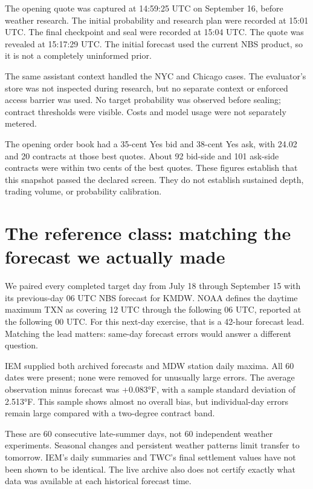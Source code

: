 \documentclass[11pt]{article}
\begin{document}
The opening quote was captured at 14:59:25 UTC on September 16, before weather research. The initial probability and research plan were recorded at 15:01 UTC. The final checkpoint and seal were recorded at 15:04 UTC. The quote was revealed at 15:17:29 UTC. The initial forecast used the current NBS product, so it is not a completely uninformed prior.


The same assistant context handled the NYC and Chicago cases. The evaluator’s store was not inspected during research, but no separate context or enforced access barrier was used. No target probability was observed before sealing; contract thresholds were visible. Costs and model usage were not separately metered.


The opening order book had a 35-cent Yes bid and 38-cent Yes ask, with 24.02 and 20 contracts at those best quotes. About 92 bid-side and 101 ask-side contracts were within two cents of the best quotes. These figures establish that this snapshot passed the declared screen. They do not establish sustained depth, trading volume, or probability calibration.


\section*{\textcolor{epdarkgreen}{The reference class: matching the forecast we actually made}}
We paired every completed target day from July 18 through September 15 with its previous-day 06 UTC NBS forecast for KMDW. NOAA defines the daytime maximum TXN as covering 12 UTC through the following 06 UTC, reported at the following 00 UTC. For this next-day exercise, that is a 42-hour forecast lead. Matching the lead matters: same-day forecast errors would answer a different question.


IEM supplied both archived forecasts and MDW station daily maxima. All 60 dates were present; none were removed for unusually large errors. The average observation minus forecast was +0.083°F, with a sample standard deviation of 2.513°F. This sample shows almost no overall bias, but individual-day errors remain large compared with a two-degree contract band.


These are 60 consecutive late-summer days, not 60 independent weather experiments. Seasonal changes and persistent weather patterns limit transfer to tomorrow. IEM’s daily summaries and TWC’s final settlement values have not been shown to be identical. The live archive also does not certify exactly what data was available at each historical forecast time.
\end{document}
